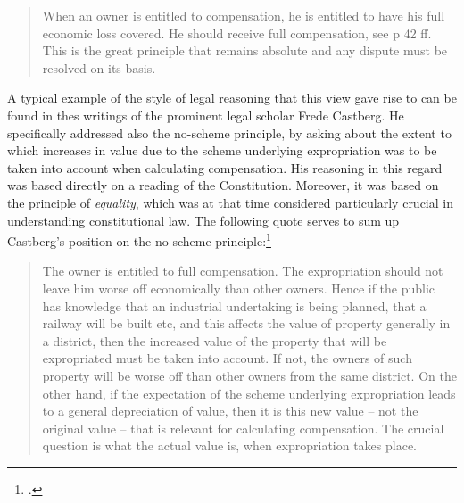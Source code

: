 \begin{quote}
When an owner is entitled to compensation, he is entitled to have his full economic loss covered. He should receive full compensation, see p 42 ff. This is the great principle that remains absolute and any dispute must be resolved on its basis.
\end{quote}

A typical example of the style of legal reasoning that this view gave rise to can be found in thes writings of the prominent legal scholar Frede Castberg. He specifically addressed also the no-scheme principle, by asking about the extent to which increases in value due to the scheme underlying expropriation was to be taken into account when calculating compensation. His reasoning in this regard was based directly on a reading of the Constitution. Moreover, it was based on the principle of \emph{equality}, which was at that time considered particularly crucial in understanding constitutional law. The following quote serves to sum up Castberg's position on the no-scheme principle:\footcite[268]{castberg64b}

\begin{quote}
The owner is entitled to full compensation. The expropriation should not leave him worse off economically than other owners. Hence if the public has knowledge that an industrial undertaking is being planned, that a railway will be built etc, and this affects the value of property generally in a district, then the increased value of the property that will be expropriated must be taken into account. If not, the owners of such property will be worse off than other owners from the same district. On the other hand, if the expectation of the scheme underlying expropriation leads to a general depreciation of value, then it is this new value -- not the original value -- that is relevant for calculating compensation. The crucial question is what the actual value is, when expropriation takes place.
\end{quote}

